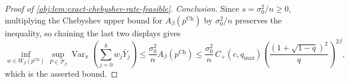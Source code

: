 \documentclass[11pt]{article}
\begin{document}
\begin{proof}[Proof of \cref{obj:lem:exact-chebyshev-rate-feasible}]
\emph{Conclusion.}
Since \(s=\sigma_0^2/n\ge0\), multiplying the Chebyshev upper bound for \(A_\beta(p^{\mathrm{Ch}})\) by \(\sigma_0^2/n\) preserves the inequality, so chaining the last two displays gives
\[
\inf_{w\in W_\beta(p^{\mathrm{Ch}})}
\sup_{P\in\mathcal P_\beta}
\operatorname{Var}_\pi\!\left(\sum_{j=0}^k w_j\bar Y_j\right)
\le
\frac{\sigma_0^2}{n}
A_\beta\!\left(p^{\mathrm{Ch}}\right)
\le
\frac{\sigma_0^2}{n}\,
C_+(c,q_{\max})
\left(\frac{(1+\sqrt{1-q})^2}{q}\right)^{2\beta},
\]
which is the asserted bound.
\end{proof}




\end{document}
